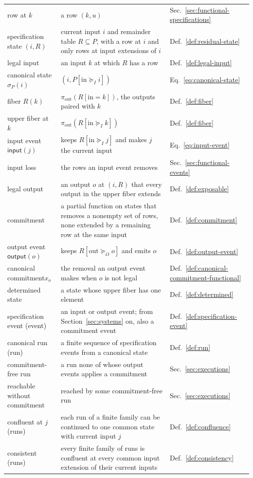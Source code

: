 \documentclass[sigconf]{cidr-2027}
\theoremstyle{remark}
\newcommand{\InputGe}{\succeq_I}
\newcommand{\OutputGe}{\succeq_O}
\newcommand{\commitment}{commitment\xspace}
\newcommand{\indesc}{input extension\xspace} %
\newcommand{\indescs}{input extensions\xspace}
\newcommand{\outrel}{extends\xspace}          %
\newcommand{\outrelpast}{extended\xspace}     %
\begin{document}
{\begin{tabular}{@{}>{\raggedright\arraybackslash}p{}>{\raggedright\arraybackslash}p{}>{\raggedright\arraybackslash}p{}@{}}
  row at $k$ & a row $(k,u)$ & Sec.~\ref{sec:functional-specifications}\\
  specification state $(i,R)$ & current input $i$ and remainder table $R\subseteq P$, with a row at $i$ and only rows at \indescs of $i$ & Def.~\ref{def:residual-state}\\
  legal input & an input $k$ at which $R$ has a row & Def.~\ref{def:legal-input}\\
  canonical state $\sigma_P(i)$ & $(i,P[\mathrm{in}\InputGe i])$ & Eq.~\ref{eq:canonical-state}\\
  fiber $R(k)$ & $\pi_{\mathrm{out}}(R[\mathrm{in}=k])$, the outputs paired with $k$ & Def.~\ref{def:fiber}\\
  upper fiber at $k$ & $\pi_{\mathrm{out}}(R[\mathrm{in}\InputGe k])$ & Def.~\ref{def:fiber}\\
  input event $\mathsf{input}(j)$ & keeps $R[\mathrm{in}\InputGe j]$ and makes $j$ the current input & Eq.~\ref{eq:input-event}\\
  input loss & the rows an input event removes & Sec.~\ref{sec:functional-events}\\
  legal output & an output $o$ at $(i,R)$ that every output in the upper fiber \outrel & Def.~\ref{def:exposable}\\
  \commitment & a partial function on states that removes a nonempty set of rows, none \outrelpast by a remaining row at the same input & Def.~\ref{def:commitment}\\
  output event $\mathsf{output}(o)$ & keeps $R[\mathrm{out}\OutputGe o]$ and emits $o$ & Def.~\ref{def:output-event}\\
  canonical \commitment $x_o$ & the removal an output event makes when $o$ is not legal & Def.~\ref{def:canonical-commitment-functional}\\
  determined state & a state whose upper fiber has one element & Def.~\ref{def:determined}\\
  specification event (event) & an input or output event; from Section~\ref{sec:systems} on, also a \commitment event & Def.~\ref{def:specification-event}\\
  canonical run (run) & a finite sequence of specification events from a canonical state & Def.~\ref{def:run}\\
  \commitment-free run & a run none of whose output events applies a \commitment & Sec.~\ref{sec:executions}\\
  reachable without \commitment & reached by some \commitment-free run & Sec.~\ref{sec:executions}\\
  confluent at $j$ (runs) & each run of a finite family can be continued to one common state with current input $j$ & Def.~\ref{def:confluence}\\
  consistent (runs) & every finite family of runs is confluent at every common \indesc of their current inputs & Def.~\ref{def:consistency}\\
  \bottomrule
\end{tabular}

}
\end{document}

